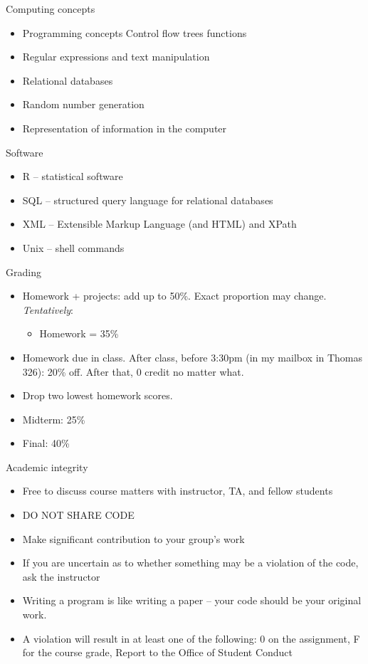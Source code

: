 \documentclass{beamer}\usepackage[]{graphicx}\usepackage[]{color}
\theoremstyle{mystyle}
\begin{document}
\begin{frame}{Computing concepts}
\begin{itemize}
\item Programming concepts
Control flow
trees
functions
\item Regular expressions and text manipulation 
\item Relational databases
\item Random number generation
\item Representation of information in the computer 
\end{itemize}
\end{frame}

\begin{frame}{Software}
\begin{itemize}
\item R – statistical software
\item SQL – structured query language for relational databases
\item XML – Extensible Markup Language (and HTML) and XPath
\item Unix – shell commands
\end{itemize}
\end{frame}

\begin{frame}{Grading}
\begin{itemize}
  \item Homework + projects: add up to 50\%. Exact proportion may
    change. {\it Tentatively}:
    \begin{itemize}
    \item Homework = 35\% %
    \end{itemize}
    \item Homework due in class. After class, before 3:30pm (in my mailbox in Thomas 326): 20\% off. After that, 0 credit no matter what.
  \item Drop two lowest homework scores. 
  \item Midterm: 25\%
  \item Final: 40\%
\end{itemize}
\end{frame}

\begin{frame}{Academic integrity}
\begin{itemize}
\item Free to discuss course matters with instructor, TA, and fellow students
\item DO NOT SHARE CODE 
\item Make significant contribution to your group’s work
\item If you are uncertain as to whether something may be a violation of the code, ask the instructor 
\item Writing a program is like writing a paper – your code should be your original work.  
\item A violation will result in at least one of the following:
0 on the assignment, 
F for the course grade, 
Report to the Office of Student Conduct
\end{itemize}
\end{frame}
\end{document}
